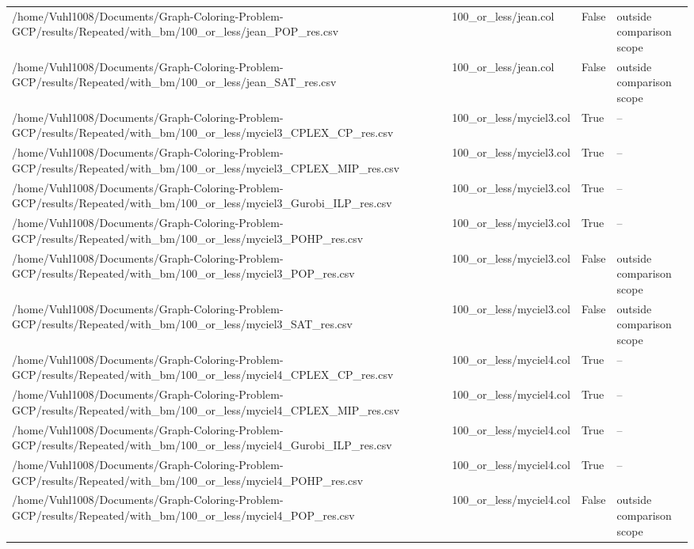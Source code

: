 \begin{table}[htbp]
\begin{tabular}{llll}
/home/Vuhl1008/Documents/Graph-Coloring-Problem-GCP/results/Repeated/with\_bm/100\_or\_less/jean\_POP\_res.csv & 100\_or\_less/jean.col & False & outside comparison scope \\
/home/Vuhl1008/Documents/Graph-Coloring-Problem-GCP/results/Repeated/with\_bm/100\_or\_less/jean\_SAT\_res.csv & 100\_or\_less/jean.col & False & outside comparison scope \\
/home/Vuhl1008/Documents/Graph-Coloring-Problem-GCP/results/Repeated/with\_bm/100\_or\_less/myciel3\_CPLEX\_CP\_res.csv & 100\_or\_less/myciel3.col & True & -- \\
/home/Vuhl1008/Documents/Graph-Coloring-Problem-GCP/results/Repeated/with\_bm/100\_or\_less/myciel3\_CPLEX\_MIP\_res.csv & 100\_or\_less/myciel3.col & True & -- \\
/home/Vuhl1008/Documents/Graph-Coloring-Problem-GCP/results/Repeated/with\_bm/100\_or\_less/myciel3\_Gurobi\_ILP\_res.csv & 100\_or\_less/myciel3.col & True & -- \\
/home/Vuhl1008/Documents/Graph-Coloring-Problem-GCP/results/Repeated/with\_bm/100\_or\_less/myciel3\_POHP\_res.csv & 100\_or\_less/myciel3.col & True & -- \\
/home/Vuhl1008/Documents/Graph-Coloring-Problem-GCP/results/Repeated/with\_bm/100\_or\_less/myciel3\_POP\_res.csv & 100\_or\_less/myciel3.col & False & outside comparison scope \\
/home/Vuhl1008/Documents/Graph-Coloring-Problem-GCP/results/Repeated/with\_bm/100\_or\_less/myciel3\_SAT\_res.csv & 100\_or\_less/myciel3.col & False & outside comparison scope \\
/home/Vuhl1008/Documents/Graph-Coloring-Problem-GCP/results/Repeated/with\_bm/100\_or\_less/myciel4\_CPLEX\_CP\_res.csv & 100\_or\_less/myciel4.col & True & -- \\
/home/Vuhl1008/Documents/Graph-Coloring-Problem-GCP/results/Repeated/with\_bm/100\_or\_less/myciel4\_CPLEX\_MIP\_res.csv & 100\_or\_less/myciel4.col & True & -- \\
/home/Vuhl1008/Documents/Graph-Coloring-Problem-GCP/results/Repeated/with\_bm/100\_or\_less/myciel4\_Gurobi\_ILP\_res.csv & 100\_or\_less/myciel4.col & True & -- \\
/home/Vuhl1008/Documents/Graph-Coloring-Problem-GCP/results/Repeated/with\_bm/100\_or\_less/myciel4\_POHP\_res.csv & 100\_or\_less/myciel4.col & True & -- \\
/home/Vuhl1008/Documents/Graph-Coloring-Problem-GCP/results/Repeated/with\_bm/100\_or\_less/myciel4\_POP\_res.csv & 100\_or\_less/myciel4.col & False & outside comparison scope \\

\end{tabular}
\end{table}
